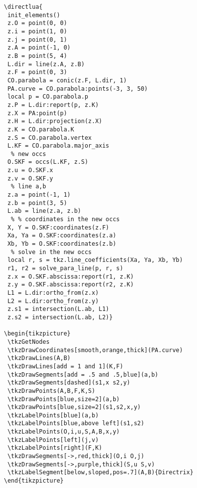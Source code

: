 \vspace{1em}
\begin{verbatim}
\directlua{
 init_elements()
 z.O = point(0, 0)
 z.i = point(1, 0)
 z.j = point(0, 1)
 z.A = point(-1, 0)
 z.B = point(5, 4)
 L.dir = line(z.A, z.B)
 z.F = point(0, 3)
 CO.parabola = conic(z.F, L.dir, 1)
 PA.curve = CO.parabola:points(-3, 3, 50)
 local p = CO.parabola.p
 z.P = L.dir:report(p, z.K)
 z.X = PA:point(p)
 z.H = L.dir:projection(z.X)
 z.K = CO.parabola.K
 z.S = CO.parabola.vertex
 L.KF = CO.parabola.major_axis
  % new occs
 O.SKF = occs(L.KF, z.S)
 z.u = O.SKF.x
 z.v = O.SKF.y
  % line a,b
 z.a = point(-1, 1)
 z.b = point(3, 5)
 L.ab = line(z.a, z.b)
  % % coordinates in the new occs
 X, Y = O.SKF:coordinates(z.F)
 Xa, Ya = O.SKF:coordinates(z.a)
 Xb, Yb = O.SKF:coordinates(z.b)
  % solve in the new occs
 local r, s = tkz.line_coefficients(Xa, Ya, Xb, Yb)
 r1, r2 = solve_para_line(p, r, s)
 z.x = O.SKF.abscissa:report(r1, z.K)
 z.y = O.SKF.abscissa:report(r2, z.K)
 L1 = L.dir:ortho_from(z.x)
 L2 = L.dir:ortho_from(z.y)
 z.s1 = intersection(L.ab, L1)
 z.s2 = intersection(L.ab, L2)}

\begin{tikzpicture}
 \tkzGetNodes
 \tkzDrawCoordinates[smooth,orange,thick](PA.curve)
 \tkzDrawLines(A,B)
 \tkzDrawLines[add = 1 and 1](K,F)
 \tkzDrawSegments[add = .5 and .5,blue](a,b)
 \tkzDrawSegments[dashed](s1,x s2,y)
 \tkzDrawPoints(A,B,F,K,S)
 \tkzDrawPoints[blue,size=2](a,b)
 \tkzDrawPoints[blue,size=2](s1,s2,x,y)
 \tkzLabelPoints[blue](a,b)
 \tkzLabelPoints[blue,above left](s1,s2)
 \tkzLabelPoints(O,i,u,S,A,B,x,y)
 \tkzLabelPoints[left](j,v)
 \tkzLabelPoints[right](F,K)
 \tkzDrawSegments[->,red,thick](O,i O,j)
 \tkzDrawSegments[->,purple,thick](S,u S,v)
 \tkzLabelSegment[below,sloped,pos=.7](A,B){Directrix}
\end{tikzpicture}
\end{verbatim}


